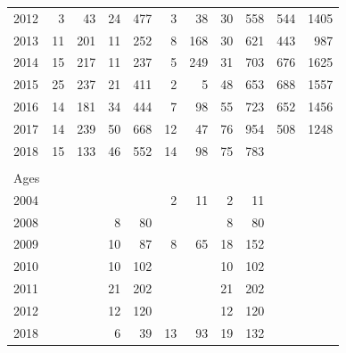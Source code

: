 \documentclass[12pt,]{article}
\begin{document}
\begin{table}[ht]
\begin{tabular}{lrrrrrrrrrr}
  2012 &   3 &  43 &  24 & 477 &   3 &  38 &  30 & 558 & 544 & 1405 \\ 
  2013 &  11 & 201 &  11 & 252 &   8 & 168 &  30 & 621 & 443 & 987 \\ 
  2014 &  15 & 217 &  11 & 237 &   5 & 249 &  31 & 703 & 676 & 1625 \\ 
  2015 &  25 & 237 &  21 & 411 &   2 &   5 &  48 & 653 & 688 & 1557 \\ 
  2016 &  14 & 181 &  34 & 444 &   7 &  98 &  55 & 723 & 652 & 1456 \\ 
  2017 &  14 & 239 &  50 & 668 &  12 &  47 &  76 & 954 & 508 & 1248 \\ 
  2018 &  15 & 133 &  46 & 552 &  14 &  98 &  75 & 783 &  &  \\ 
   &  &  &  &  &  &  &  &  &  &  \\ 
  Ages &  &  &  &  &  &  &  &  &  &  \\ 
  2004 &  &  &  &  &   2 &  11 &   2 &  11 &  &  \\ 
  2008 &  &  &   8 &  80 &  &  &   8 &  80 &  &  \\ 
  2009 &  &  &  10 &  87 &   8 &  65 &  18 & 152 &  &  \\ 
  2010 &  &  &  10 & 102 &  &  &  10 & 102 &  &  \\ 
  2011 &  &  &  21 & 202 &  &  &  21 & 202 &  &  \\ 
  2012 &  &  &  12 & 120 &  &  &  12 & 120 &  &  \\ 
  2018 &  &  &   6 &  39 &  13 &  93 &  19 & 132 &  &  \\ 
   \hline
  \end{tabular}
\end{table}

\FloatBarrier
\newpage
\end{document}
